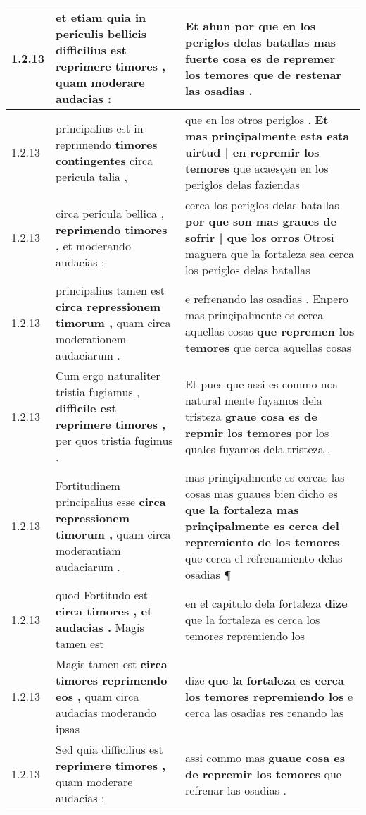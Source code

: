 \begin{tabular}{|p{1cm}|p{6.5cm}|p{6.5cm}|}
1.2.13 & et etiam quia in periculis bellicis \textbf{ difficilius est reprimere timores , } quam moderare audacias : & Et ahun por que en los periglos delas batallas \textbf{ mas fuerte cosa es de repremer los temores } que de restenar las osadias . \\\hline
1.2.13 & principalius est in reprimendo \textbf{ timores contingentes } circa pericula talia , & que en los otros periglos . \textbf{ Et mas prinçipalmente esta esta uirtud | en repremir los temores } que acaesçen en los periglos delas faziendas \\\hline
1.2.13 & circa pericula bellica , \textbf{ reprimendo timores , } et moderando audacias : & cerca los periglos delas batallas \textbf{ por que son mas graues de sofrir | que los orros } Otrosi maguera que la fortaleza sea cerca los periglos delas batallas \\\hline
1.2.13 & principalius tamen est \textbf{ circa repressionem timorum , } quam circa moderationem audaciarum . & e refrenando las osadias . Enpero mas prinçipalmente es cerca aquellas cosas \textbf{ que repremen los temores } que cerca aquellas cosas \\\hline
1.2.13 & Cum ergo naturaliter tristia fugiamus , \textbf{ difficile est reprimere timores , } per quos tristia fugimus . & Et pues que assi es commo nos natural mente fuyamos dela tristeza \textbf{ graue cosa es de repmir los temores } por los quales fuyamos dela tristeza . \\\hline
1.2.13 & Fortitudinem principalius esse \textbf{ circa repressionem timorum , } quam circa moderantiam audaciarum . & mas prinçipalmente es cercas las cosas mas guaues bien dicho es \textbf{ que la fortaleza mas prinçipalmente es cerca del repremiento de los temores } que cerca el refrenamiento delas osadias ¶ \\\hline
1.2.13 & quod Fortitudo est \textbf{ circa timores , et audacias . } Magis tamen est & en el capitulo dela fortaleza \textbf{ dize } que la fortaleza es cerca los temores repremiendo los \\\hline
1.2.13 & Magis tamen est \textbf{ circa timores reprimendo eos , } quam circa audacias moderando ipsas & dize \textbf{ que la fortaleza es cerca los temores repremiendo los } e cerca las osadias res renando las \\\hline
1.2.13 & Sed quia difficilius est \textbf{ reprimere timores , } quam moderare audacias : & assi commo mas \textbf{ guaue cosa es de repremir los temores } que refrenar las osadias . \\\hline

\end{tabular}
